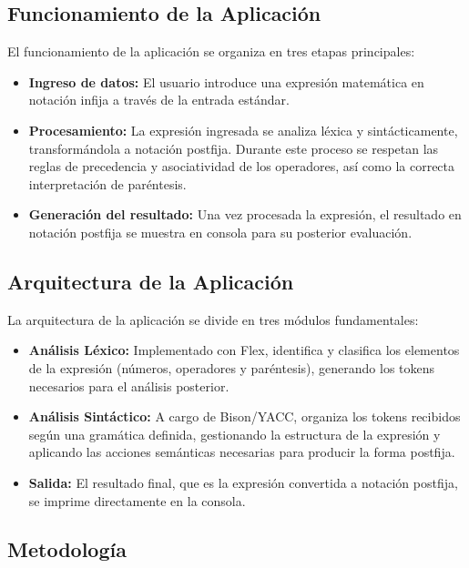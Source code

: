 \documentclass{article}
\begin{document}
\subsection*{Funcionamiento de la Aplicación}

El funcionamiento de la aplicación se organiza en tres etapas principales:  
\begin{itemize}
    \item \textbf{Ingreso de datos:} El usuario introduce una expresión matemática en notación infija a través de la entrada estándar.
    \item \textbf{Procesamiento:} La expresión ingresada se analiza léxica y sintácticamente, transformándola a notación postfija. Durante este proceso se respetan las reglas de precedencia y asociatividad de los operadores, así como la correcta interpretación de paréntesis.
    \item \textbf{Generación del resultado:} Una vez procesada la expresión, el resultado en notación postfija se muestra en consola para su posterior evaluación.
\end{itemize}

\subsection*{Arquitectura de la Aplicación}

La arquitectura de la aplicación se divide en tres módulos fundamentales:  
\begin{itemize}
    \item \textbf{Análisis Léxico:} Implementado con Flex, identifica y clasifica los elementos de la expresión (números, operadores y paréntesis), generando los tokens necesarios para el análisis posterior.
    \item \textbf{Análisis Sintáctico:} A cargo de Bison/YACC, organiza los tokens recibidos según una gramática definida, gestionando la estructura de la expresión y aplicando las acciones semánticas necesarias para producir la forma postfija.
    \item \textbf{Salida:} El resultado final, que es la expresión convertida a notación postfija, se imprime directamente en la consola.
\end{itemize}
\subsection{Metodología}
\end{document}
